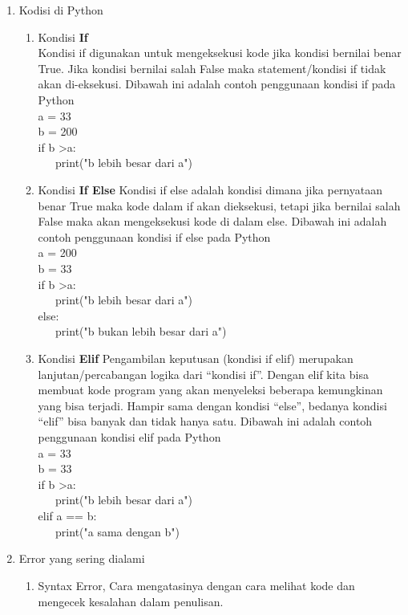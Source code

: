 \begin{enumerate}
\item Kodisi di Python
\begin{enumerate}
\item Kondisi \textbf{If}\\
Kondisi if digunakan untuk mengeksekusi kode jika kondisi bernilai benar True. Jika kondisi bernilai salah False maka statement/kondisi if tidak akan di-eksekusi. Dibawah ini adalah contoh penggunaan kondisi if pada Python\\
a = 33\\
b = 200\\
if b \textgreater a:\\
\verb|   |print("b lebih besar dari a")
\item Kondisi \textbf{If Else}
Kondisi if else adalah kondisi dimana jika pernyataan benar True maka kode dalam if akan dieksekusi, tetapi jika bernilai salah False maka akan mengeksekusi kode di dalam else. Dibawah ini adalah contoh penggunaan kondisi if else pada Python\\
a = 200\\
b = 33\\
if b \textgreater a:\\
\verb|   |print("b lebih besar dari a")\\
else:\\
\verb|   |print("b bukan lebih besar dari a")\\
\item Kondisi \textbf{Elif}
Pengambilan keputusan (kondisi if elif) merupakan lanjutan/percabangan logika dari “kondisi if”. Dengan elif kita bisa membuat kode program yang akan menyeleksi beberapa kemungkinan yang bisa terjadi. Hampir sama dengan kondisi “else”, bedanya kondisi “elif” bisa banyak dan tidak hanya satu. Dibawah ini adalah contoh penggunaan kondisi elif pada Python\\
a = 33\\
b = 33\\
if b \textgreater a:\\
\verb|   |print("b lebih besar dari a")\\
elif a == b:\\
\verb|   |print("a sama dengan b")\\
\end{enumerate}
\item Error yang sering dialami 
\begin{enumerate}
\item Syntax Error, Cara mengatasinya dengan cara melihat kode dan mengecek kesalahan dalam penulisan.\\

\end{enumerate}
\end{enumerate}

